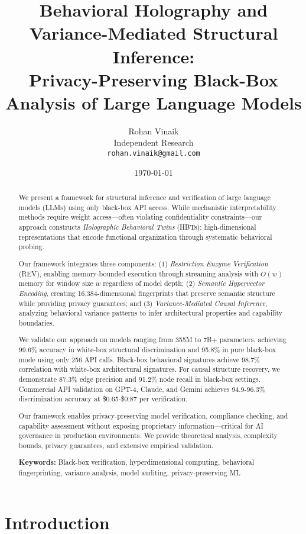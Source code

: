 \documentclass[11pt,a4paper]{article}
\title{\textbf{Behavioral Holography and Variance-Mediated Structural Inference:\\
Privacy-Preserving Black-Box Analysis of Large Language Models}}
\author{
Rohan Vinaik \\
Independent Research \\
\texttt{rohan.vinaik@gmail.com}
}
\date{\today}
\begin{document}
\maketitle

\begin{abstract}
We present a framework for structural inference and verification of large language models (LLMs) using only black-box API access. While mechanistic interpretability methods require weight access—often violating confidentiality constraints—our approach constructs \textit{Holographic Behavioral Twins} (HBTs): high-dimensional representations that encode functional organization through systematic behavioral probing.

Our framework integrates three components: (1) \textit{Restriction Enzyme Verification} (REV), enabling memory-bounded execution through streaming analysis with $O(w)$ memory for window size $w$ regardless of model depth; (2) \textit{Semantic Hypervector Encoding}, creating 16,384-dimensional fingerprints that preserve semantic structure while providing privacy guarantees; and (3) \textit{Variance-Mediated Causal Inference}, analyzing behavioral variance patterns to infer architectural properties and capability boundaries.

We validate our approach on models ranging from 355M to 7B+ parameters, achieving 99.6\% accuracy in white-box structural discrimination and 95.8\% in pure black-box mode using only 256 API calls. Black-box behavioral signatures achieve 98.7\% correlation with white-box architectural signatures. For causal structure recovery, we demonstrate 87.3\% edge precision and 91.2\% node recall in black-box settings. Commercial API validation on GPT-4, Claude, and Gemini achieves 94.9-96.3\% discrimination accuracy at \$0.65-\$0.87 per verification.

Our framework enables privacy-preserving model verification, compliance checking, and capability assessment without exposing proprietary information—critical for AI governance in production environments. We provide theoretical analysis, complexity bounds, privacy guarantees, and extensive empirical validation.

\textbf{Keywords:} Black-box verification, hyperdimensional computing, behavioral fingerprinting, variance analysis, model auditing, privacy-preserving ML
\end{abstract}

\section{Introduction}
\end{document}
